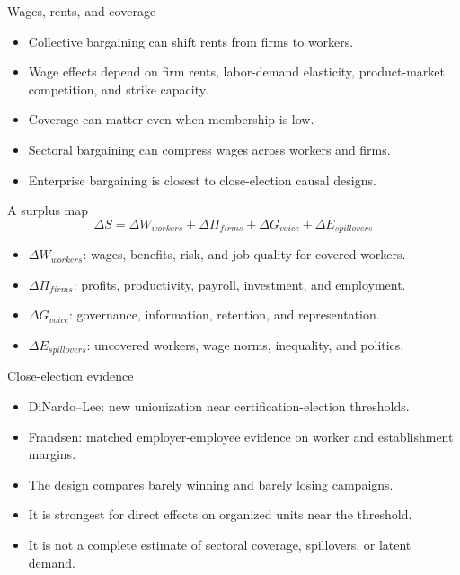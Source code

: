 \documentclass[aspectratio=169,11pt]{beamer}
\begin{document}
\begin{frame}{Wages, rents, and coverage}
\begin{itemize}
    \item Collective bargaining can shift rents from firms to workers.
    \item Wage effects depend on firm rents, labor-demand elasticity, product-market competition, and strike capacity.
    \item Coverage can matter even when membership is low.
    \item Sectoral bargaining can compress wages across workers and firms.
    \item Enterprise bargaining is closest to close-election causal designs.
\end{itemize}
\end{frame}

\begin{frame}{A surplus map}
\[
\Delta S
= \Delta W_{workers}
+ \Delta \Pi_{firms}
+ \Delta G_{voice}
+ \Delta E_{spillovers}
\]
\begin{itemize}
    \item $\Delta W_{workers}$: wages, benefits, risk, and job quality for covered workers.
    \item $\Delta \Pi_{firms}$: profits, productivity, payroll, investment, and employment.
    \item $\Delta G_{voice}$: governance, information, retention, and representation.
    \item $\Delta E_{spillovers}$: uncovered workers, wage norms, inequality, and politics.
\end{itemize}
\end{frame}

\begin{frame}{Close-election evidence}
\begin{itemize}
    \item DiNardo--Lee: new unionization near certification-election thresholds.
    \item Frandsen: matched employer-employee evidence on worker and establishment margins.
    \item The design compares barely winning and barely losing campaigns.
    \item It is strongest for direct effects on organized units near the threshold.
    \item It is not a complete estimate of sectoral coverage, spillovers, or latent demand.
\end{itemize}
\end{frame}
\end{document}
